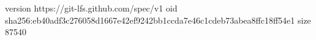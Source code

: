 version https://git-lfs.github.com/spec/v1
oid sha256:eb40adf3c276058d1667e42ef9242bb1ccda7e46c1cdeb73abea8ffc18ff54e1
size 87540
